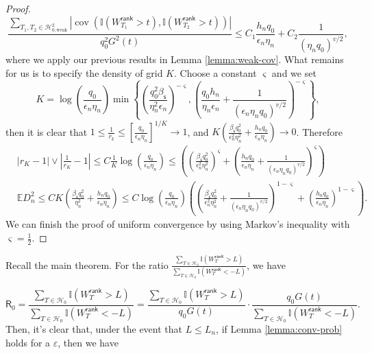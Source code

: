 \documentclass[12pt]{article}
\newcommand{\abs}[1]{\left\lvert#1\right\rvert}
\newcommand{\E}{\mathbb{E}}
\newcommand{\cH}{\mathcal{H}}
\newcommand{\bbI}{\mathbb{I}}
\newcommand{\sfR}{{\mathsf{R}}}
\theoremstyle{plain}
\begin{document}
\begin{proof}
\begin{equation*}
    \frac{\sum\limits_{T_1,T_2\in\cH^2_{0,\text{weak}} } \abs{\operatorname{cov}(\bbI(W_{T_1}^{\mathsf{rank} }>t),\bbI(W_{T_2}^{\mathsf{rank} }>t)) }}{q_0^2 G^2(t)}\le C_1 \frac{h_n q_0}{\epsilon_n \eta_n }+C_2 \frac{1}{ \left(\eta_n q_0\right)^{v/2} },
\end{equation*}
 where we apply our previous results in Lemma \ref{lemma:weak-cov}. What remains for us is to specify the density of grid $K$. Choose a constant $\varsigma$ and we set
 $$K= \log(\frac{q_0 }{\epsilon_n \eta_n}) \min \left\{ \left(\frac{ q_0^2 \beta_{\mathsf{s}} }{ \eta_n^2 \epsilon_n  }\right)^{-\varsigma} , \left( \frac{q_0 h_n}{\eta_n\epsilon_n}+\frac{1}{ \left(\epsilon_n\eta_n q_0\right)^{v/2} } \right)^{-\varsigma} \right\}  ,$$ 
 then it is clear that $1\le\frac{1}{r_k}\le \left[ \frac{q_0}{\epsilon_n \eta_n} \right]^{1/K}\to 1$, and $ K (\frac{\beta_{\mathsf{s}}q_0^2 }{ \epsilon_n^2\eta_n^2} + \frac{h_n q_0}{\epsilon_n \eta_n })\to 0$. Therefore 
 \begin{equation*}
\begin{aligned}
      &\abs{r_K-1}\vee\abs{\frac{1}{r_K}-1 } \le C \frac{1}{K}\log(\frac{q_0 }{\epsilon_n \eta_n}) \le  \left( \left(\frac{\beta_{\mathsf{s}} q_0^2 }{ \epsilon_n^2\eta_n^2}\right)^{\varsigma} + \left(\frac{h_n q_0}{\epsilon_n \eta_n} +\frac{1}{ \left(\epsilon_n\eta_n q_0\right)^{v/2} }\right)^{\varsigma}\right) \\
    &\E D^2_n  \le C K \left(\frac{\beta_{\mathsf{s}}q_0^2 }{ \eta_n^2} + \frac{h_n q_0}{\epsilon_n \eta_n} \right)\le C \log(\frac{q_0 }{\epsilon_n \eta_n}) \left( \left(\frac{\beta_{\mathsf{s}} q_0^2 }{ \epsilon_n^2\eta_n^2}+\frac{1}{ \left(\epsilon_n\eta_n q_0\right)^{v/2} }\right)^{1-\varsigma} + \left(\frac{h_n q_0}{\epsilon_n \eta_n} \right)^{1-\varsigma}\right).
\end{aligned}
 \end{equation*}
We can finish the proof of uniform convergence by using Markov's inequality with $\varsigma=\frac{1}{2}$.
\end{proof}

Recall the main theorem. For the ratio $\frac{\sum_{T\in \cH_0  } \bbI(W_T^{\mathsf{rank} } >L ) }{ \sum_{T\in \cH_0  } \bbI(W_T^{\mathsf{rank} } <-L )}$, we have

\begin{equation*}
    \sfR_0=\frac{\sum_{T\in \cH_0  } \bbI(W_T^{\mathsf{rank} } >L ) }{ \sum_{T\in \cH_0  } \bbI(W_T^{\mathsf{rank} } <-L )} =  \frac{\sum_{T\in \cH_0  } \bbI(W_T^{\mathsf{rank} } >L ) }{ q_0 G(t) } \cdot \frac{q_0 G(t) }{  \sum_{T\in \cH_0  } \bbI(W_T^{\mathsf{rank} } <-L ) }.
\end{equation*}
Then, it's clear that, under the event that $L\le L_n$, if Lemma \ref{lemma:conv-prob} holds for a $\varepsilon$, then we have
\end{document}
